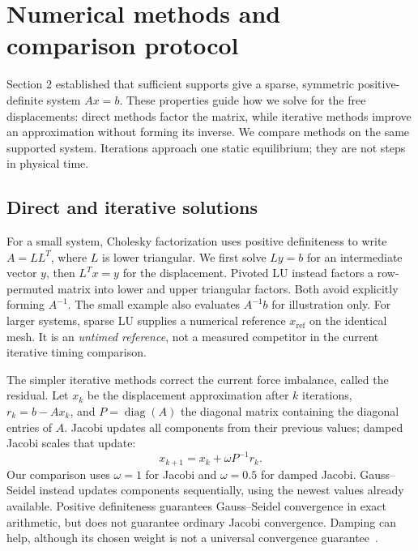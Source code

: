 \section{Numerical methods and comparison protocol}
\label{sec:solvers-protocol}

Section 2 established that sufficient supports give a sparse, symmetric
positive-definite system $Ax=b$. These properties guide how we solve for
the free displacements: direct methods factor the matrix, while iterative
methods improve an approximation without forming its inverse. We compare methods on the same supported system. Iterations approach one
static equilibrium; they are not steps in physical time.

\subsection{Direct and iterative solutions}
For a small system, Cholesky factorization uses positive definiteness to
write $A=LL^T$, where $L$ is lower triangular. We first solve $Ly=b$ for
an intermediate vector $y$, then $L^Tx=y$ for the displacement. Pivoted
LU instead factors a row-permuted matrix into lower and upper triangular
factors. Both avoid explicitly forming $A^{-1}$. The small example also evaluates $A^{-1}b$ for illustration only. For larger systems, sparse LU supplies a numerical reference
$x_{\mathrm{ref}}$ on the identical mesh. It is an \emph{untimed reference},
not a measured competitor in the current iterative timing comparison.

The simpler iterative methods correct the current force imbalance,
called the residual. Let $x_k$ be the displacement approximation after
$k$ iterations, $r_k=b-Ax_k$, and $P=\operatorname{diag}(A)$ the diagonal
matrix containing the diagonal entries of $A$. Jacobi updates all
components from their previous values; damped Jacobi scales that update:
\begin{equation}
 x_{k+1}=x_k+\omega P^{-1}r_k.
 \label{eq:solvers-jacobi}
\end{equation}
Our comparison uses $\omega=1$ for Jacobi and $\omega=0.5$ for damped
Jacobi. Gauss--Seidel instead updates components sequentially, using the
newest values already available. Positive definiteness guarantees
Gauss--Seidel convergence in exact arithmetic, but does not guarantee
ordinary Jacobi convergence. Damping can help, although its chosen weight
is not a universal convergence guarantee~\cite{saad-iterative}.

